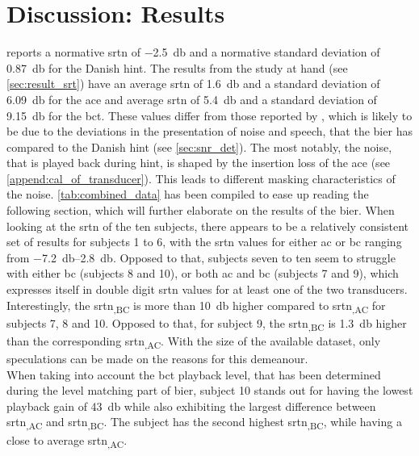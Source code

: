 \section{Discussion: Results}\label{sec:disc_res}
\citep{hint_2011} reports a normative \gls{srtn} of \SI{-2.5}{\decibel} and a normative standard deviation of \SI{0.87}{\decibel} for the Danish \gls{hint}. The results from the study at hand (see \autoref{sec:result_srt}) have an average \gls{srtn} of \SI{1.6}{\decibel} and a standard deviation of \SI{6.09}{\decibel} for the \gls{ace} and average \gls{srtn} of \SI{5.4}{\decibel} and a standard deviation of \SI{9.15}{\decibel} for the \gls{bct}.
These values differ from those reported by \citep{hint_2011}, which is likely to be due to the deviations in the presentation of noise and speech, that the \gls{bier} has compared to the Danish \gls{hint} (see \autoref{sec:snr_det}).
The most notably, the noise, that is played back during \gls{hint}, is shaped by the insertion loss of the \gls{ace} (see \autoref{append:cal_of_transducer}). This leads to different masking characteristics of the noise. 
\autoref{tab:combined_data} has been compiled to ease up reading the following section, which will further elaborate on the results of the \gls{bier}.
When looking at the \gls{srtn} of the ten subjects, there appears to be a relatively consistent set of results for subjects 1 to 6, with the \gls{srtn} values for either \gls{ac} or \gls{bc} ranging from \SIrange{-7.2}{2.8}{\decibel}. 
Opposed to that, subjects seven to ten seem to struggle with either \gls{bc} (subjects 8 and 10), or both \gls{ac} and \gls{bc} (subjects 7 and 9), which expresses itself in double digit \gls{srtn} values for at least one of the two transducers. 
Interestingly, the \gls{srtn}\textsubscript{,BC} is more than \SI{10}{\decibel} higher compared to \gls{srtn}\textsubscript{,AC} for subjects 7, 8 and 10. Opposed to that, for subject 9, the \gls{srtn}\textsubscript{,BC} is \SI{1.3}{\decibel} higher than the corresponding \gls{srtn}\textsubscript{,AC}.
With the size of the available dataset, only speculations can be made on the reasons for this demeanour.\\
When taking into account the \gls{bct} playback level, that has been determined during the level matching part of \gls{bier}, subject 10 stands out for having the lowest playback gain of \SI{43}{\decibel} while also exhibiting the largest difference between \gls{srtn}\textsubscript{,AC} and \gls{srtn}\textsubscript{,BC}. 
The subject has the second highest \gls{srtn}\textsubscript{,BC}, while having a close to average \gls{srtn}\textsubscript{,AC}.
